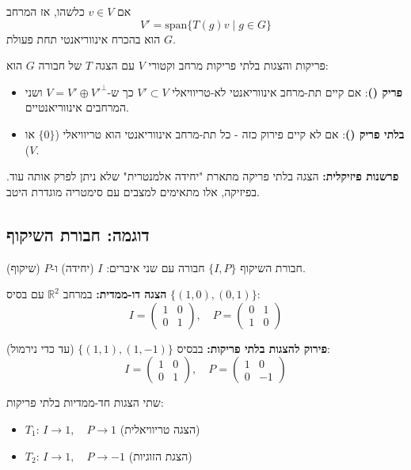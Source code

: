 \begin{notebox}
אם $v \in V$ כלשהו, אז המרחב
\[
V' = \text{span}\{T(g)v \mid g \in G\}
\]
הוא בהכרח אינווריאנטי תחת פעולת $G$.
\end{notebox}

\begin{definitionbox}[label=def:reducible]{פריקות והצגות בלתי פריקות}
מרחב וקטורי $V$ עם הצגה $T$ של חבורה $G$ הוא:
\begin{itemize}
    \item \textbf{פריק ()}: אם קיים תת-מרחב אינווריאנטי לא-טריוויאלי $V' \subset V$ כך ש-$V = V' \oplus V'^\perp$ ושני המרחבים אינווריאנטיים.
    \item \textbf{בלתי פריק ()}: אם לא קיים פירוק כזה - כל תת-מרחב אינווריאנטי הוא טריוויאלי ($\{0\}$ או $V$).
\end{itemize}
\end{definitionbox}

\textbf{פרשנות פיזיקלית:} הצגה בלתי פריקה מתארת "יחידה אלמנטרית" שלא ניתן לפרק אותה עוד. בפיזיקה, אלו מתאימים למצבים עם סימטריה מוגדרת היטב.

\subsection{דוגמה: חבורת השיקוף}

\begin{examplebox}[label=ex:reflection_group]{חבורת השיקוף $\{I, P\}$}
חבורה עם שני איברים: $I$ (יחידה) ו-$P$ (שיקוף).

\textbf{הצגה דו-ממדית:} במרחב $\mathbb{R}^2$ עם בסיס $\{(1,0), (0,1)\}$:
\[
I = \begin{pmatrix} 1 & 0 \\ 0 & 1 \end{pmatrix}, \quad
P = \begin{pmatrix} 0 & 1 \\ 1 & 0 \end{pmatrix}
\]

\textbf{פירוק להצגות בלתי פריקות:} בבסיס $\{(1,1), (1,-1)\}$ (עד כדי נירמול):
\[
I = \begin{pmatrix} 1 & 0 \\ 0 & 1 \end{pmatrix}, \quad
P = \begin{pmatrix} 1 & 0 \\ 0 & -1 \end{pmatrix}
\]

שתי הצגות חד-ממדיות בלתי פריקות:
\begin{itemize}
    \item $T_1$: $I \to 1, \quad P \to 1$ (הצגה טריוויאלית)
    \item $T_2$: $I \to 1, \quad P \to -1$ (הצגת הזוגיות)
\end{itemize}
\end{examplebox}

